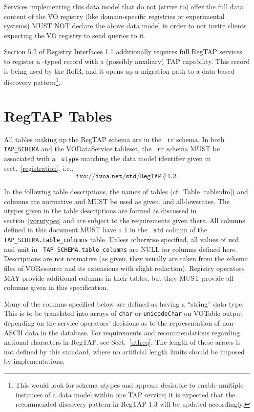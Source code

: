 \documentclass[11pt,a4paper]{ivoa}
\newcommand{\tapent}[1]{\texttt{\color{tapcolor} #1}}
\begin{document}
Services implementing this data model that do not (strive to) offer
the full data content of the VO registry (like domain-specific
registries or experimental systems) MUST NOT declare the above data
model in order to not invite clients expecting the VO registry to send
queries to it.

Section 5.2 of Registry Interfaces 1.1 additionally requires full RegTAP
services to register a -typed record with a (possibly
auxiliary) TAP capability.  This record is being used by the RofR, and
it opens up a migration path to a data-based discovery
pattern\footnote{This would look for schema utypes and appears
desirable to enable multiple instances of a data model within one TAP
service; it is expected that the recommended discovery pattern
in RegTAP 1.3 will be updated accordingly.}.




\section{RegTAP Tables}

\label{vortables}

All tables making up the RegTAP schema are in the \tapent{rr} schema.
In both \tapent{TAP\_SCHEMA} and the VODataService tableset, the
\tapent{rr} schema
MUST be associated with a \tapent{utype} matching the data model
identifier given in sect.~\ref{registration}, i.e.,
$$\texttt{ivo://ivoa.net/std/RegTAP\#1.2}.$$

In the following table descriptions, the names of tables
(cf.~Table \ref{table:dm}) and columns
are normative and MUST be used as given, and all-lowercase.  The utypes
given in the table descriptions are formed as discussed
in section~\ref{vorutypes} and are subject to the requirements given
there.  All columns defined in
this document MUST have a 1 in the \tapent{std} column of the
\tapent{TAP\_SCHEMA.table\_columns} table.  Unless otherwise
specified, all values of ucd and unit in
\tapent{TAP\_SCHEMA.table\_columns} are NULL for columns defined here.
Descriptions are not normative (as given, they usually are taken from
the schema files of VOResource and its extensions with slight
redaction).  Registry operators MAY provide additional columns in their
tables, but they MUST provide all columns given in this
specification.

Many of the columns specified below are defined as having a ``string''
data type.  This is to be translated into arrays of \texttt{char} or
\texttt{unicodeChar} on VOTable output depending on the service
operators' decisions as to the representation of non-ASCII data in the
database.  For requirements and recommendations regarding national
characters in RegTAP, see Sect.~\ref{utfreq}.  The length of these
arrays is not defined by this standard, where no artificial
length limits should be imposed by implementations.
\end{document}
